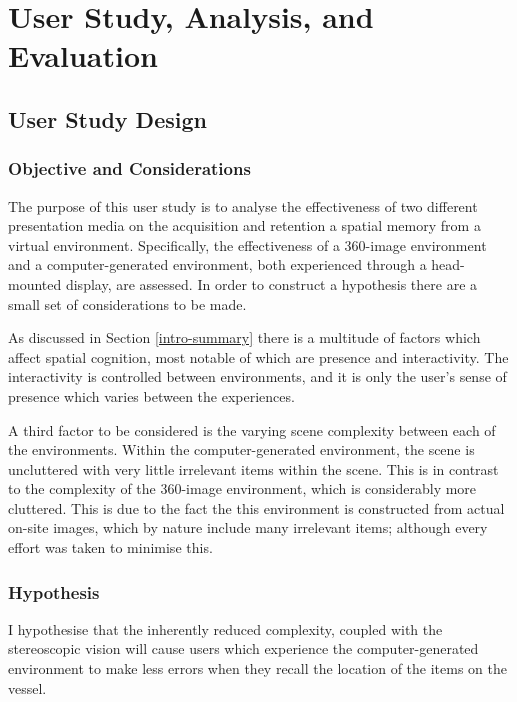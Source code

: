 \documentclass[ %
                    author={Elis Jones},
                supervisor={Dr. Kirsten Cater},
                    degree={BSc},
                     title={The Effect of Presentation Medium on Spatial Cognition},
                  subtitle={in the Virtual Environment},
                      year={2018} ]{dissertation}
\begin{document}
\chapter{User Study, Analysis, and Evaluation}\label{user-study-chapter}

\section{User Study Design}

\subsection{Objective and Considerations}
The purpose of this user study is to analyse the effectiveness of two different presentation media on the acquisition and retention a spatial memory from a virtual environment. Specifically, the effectiveness of a 360-image environment and a computer-generated environment, both experienced through a head-mounted display, are assessed. In order to construct a hypothesis there are a small set of considerations to be made.

As discussed in Section \ref{intro-summary} there is a multitude of factors which affect spatial cognition, most notable of which are presence and interactivity. The interactivity is controlled between environments, and it is only the user's sense of presence which varies between the experiences. 

A third factor to be considered is the varying scene complexity between each of the environments.  Within the computer-generated environment, the scene is uncluttered with very little irrelevant items within the scene. This is in contrast to the complexity of the 360-image environment, which is considerably more cluttered. This is due to the fact the this environment is constructed from actual on-site images, which by nature include many irrelevant items; although every effort was taken to minimise this. 

\subsection{Hypothesis}\label{hypothesis}
I hypothesise that the inherently reduced complexity, coupled with the stereoscopic vision will cause users which experience the computer-generated environment to make less errors when they recall the location of the items on the vessel.
\end{document}
